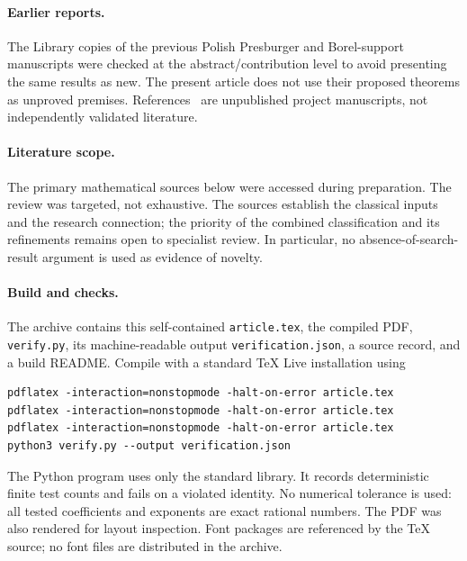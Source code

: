 \documentclass[11pt]{article}
\numberwithin{equation}{section}
\theoremstyle{definition}
\theoremstyle{remark}
\begin{document}
\paragraph{Earlier reports.}
The Library copies of the previous Polish Presburger and Borel-support
manuscripts were checked at the abstract/contribution level to avoid presenting
the same results as new. The present article does not use their proposed
theorems as unproved premises. References~\cite{s09:PriorPresburger,s09:PriorSupport}
are unpublished project manuscripts, not independently validated literature.

\paragraph{Literature scope.}
The primary mathematical sources below were accessed during preparation.
The review was targeted, not exhaustive. The sources establish the classical
inputs and the research connection; the priority of the combined classification
and its refinements remains open to specialist review. In particular, no
absence-of-search-result argument is used as evidence of novelty.

\paragraph{Build and checks.}
The archive contains this self-contained \texttt{article.tex}, the compiled
PDF, \texttt{verify.py}, its machine-readable output
\texttt{verification.json}, a source record, and a build README.
Compile with a standard TeX Live installation using
\begin{verbatim}
pdflatex -interaction=nonstopmode -halt-on-error article.tex
pdflatex -interaction=nonstopmode -halt-on-error article.tex
pdflatex -interaction=nonstopmode -halt-on-error article.tex
python3 verify.py --output verification.json
\end{verbatim}
The Python program uses only the standard library. It records deterministic
finite test counts and fails on a violated identity. No numerical tolerance
is used: all tested coefficients and exponents are exact rational numbers.
The PDF was also rendered for layout inspection. Font packages are referenced
by the TeX source; no font files are distributed in the archive.
\end{document}
